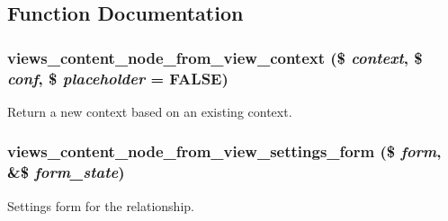 \subsection{Function Documentation}
\hypertarget{node__from__view_8inc_aec0e25eb34d28184ac8028e9132e882c}{
\subsubsection[{views\_\-content\_\-node\_\-from\_\-view\_\-context}]{\setlength{\rightskip}{0pt plus 5cm}views\_\-content\_\-node\_\-from\_\-view\_\-context (\$ {\em context}, \/  \$ {\em conf}, \/  \$ {\em placeholder} = {\ttfamily FALSE})}}
\label{node__from__view_8inc_aec0e25eb34d28184ac8028e9132e882c}
Return a new context based on an existing context. \hypertarget{node__from__view_8inc_a6223e4e367fd97ccd351ea1811aa9649}{
\subsubsection[{views\_\-content\_\-node\_\-from\_\-view\_\-settings\_\-form}]{\setlength{\rightskip}{0pt plus 5cm}views\_\-content\_\-node\_\-from\_\-view\_\-settings\_\-form (\$ {\em form}, \/  \&\$ {\em form\_\-state})}}
\label{node__from__view_8inc_a6223e4e367fd97ccd351ea1811aa9649}
Settings form for the relationship. 

